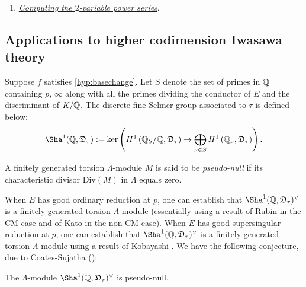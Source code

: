 \documentclass[a4paper,11pt]{article}
\numberwithin{equation}{section}
\newcommand{\DDD}{\mathfrak{D}}
\begin{document}
\begin{enumerate}[style=sameline, style=sameline, align=left,label=(\textsc{Step 5}) --- , ref=(\textsc{Step 5})]
\item\label{step5} \underline{\emph{Computing the $2$-variable power series}}.
\end{enumerate}


\subsection{Applications to higher codimension Iwasawa theory} \label{sec:appIw}


Suppose $f$ satisfies \ref{hyp:basechange}. Let $S$ denote the set of primes in $\mathbb{Q}$ containing $p$, $\infty$ along with all the primes dividing the conductor of $E$ and the discriminant of $K/\mathbb{Q}$. The discrete fine Selmer group associated to $\tau$ is defined below:
\begin{align*}
\Sha^1(\Q,\DDD_\tau):= \mathrm{ker}\left(H^1\left(\Q_S/\Q, \DDD_\tau\right) \rightarrow \bigoplus_{\nu \in S} H^1\left(\Q_\nu, \DDD_\tau \right) \right).
\end{align*}






\begin{definition}\label{defn:pseudonull}
A finitely generated torsion $\Lambda$-module $M$ is said to be \textit{pseudo-null} if its characteristic divisor $\mathrm{Div}(M)$ in $\Lambda$ equals zero.
\end{definition}
When $E$ has good ordinary reduction at $p$, one can establish that $\Sha^1(\Q,\DDD_\tau)^\vee$  is a finitely generated torsion $\Lambda$-module (essentially using a result of Rubin in the CM case and of Kato \cite{Kat04} in the non-CM case). When $E$ has good supersingular reduction at $p$, one can establish that $\Sha^1(\Q,\DDD_\tau)^\vee$ is a finitely generated torsion $\Lambda$-module using a result of Kobayashi \cite{MR1965358}. We have the following conjecture, due to Coates-Sujatha (\cite[Conjecture B]{MR2148798}):
\begin{conjecture} \label{conj:CS}
\item The $\Lambda$-module $\Sha^1(\Q,\DDD_\tau)^\vee$ is pseudo-null.
\end{conjecture}
\end{document}
